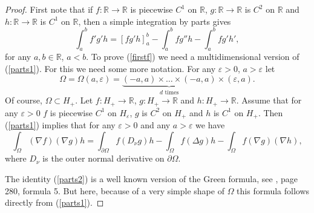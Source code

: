 \documentclass[11pt,leqno]{article}
\theoremstyle{definition}
\newcommand{\R}{\mathbb{R}}
\newcommand{\eps}{\varepsilon}
\numberwithin{equation}{section}
\begin{document}
\begin{proof}
First note that if $f: \R \to \R$ is 
piecewise $C^1$ on $\R$, $g: \R \to \R$ 
 is $C^2$ on $\R$ and  $h: \R \to \R$  is $C^1$ on $\R$, then a simple integration by
parts gives
\begin{equation}
\label{parts1}
\int_a^b f' g' h = [f g' h]_a^b - \int_a^b f g'' h - \int_a^b f g' h',
\end{equation}
for any $a,b \in \R$, $a < b$.
 To prove (\ref{firstf}) we need a multidimensional version of
(\ref{parts1}).  For this we need  some more notation. For any $\eps > 0$, $a > \eps$ let 
$$
\Omega = \Omega(a,\eps) = \underbrace{(-a,a) \times \ldots \times
  (-a,a)}_{d \, \, \text{times}} \times (\eps,a). 
$$ 
Of course, $\Omega \subset H_+$. Let $f: H_+ \to \R$, $g: H_+ \to \R$ and $h: H_+ \to \R$.
Assume that for any $\eps > 0$ $f$ is piecewise $C^1$ on $H_{\eps}$, $g$ is $C^2$ on $H_+$
and $h$ is $C^1$ on $H_+$. Then (\ref{parts1}) implies that for any $\eps > 0$ and any $a >
\eps$ we have
\begin{equation}
\label{parts2}
\int_{\Omega} (\nabla f) (\nabla g) h = \int_{\partial \Omega} f (D_{\nu} g) h - \int_{\Omega} f (\Delta g) h - \int_{\Omega} f (\nabla g) (\nabla h),
\end{equation}
where $D_{\nu}$ is the outer normal derivative on $\partial \Omega$.

The identity (\ref{parts2}) is a well known  version of the Green formula, see
\cite{CH}, page 280, formula 5.  But here, because of a very simple shape of $\Omega$ 
this formula  follows directly from  (\ref{parts1}).


\end{proof}
\end{document}
